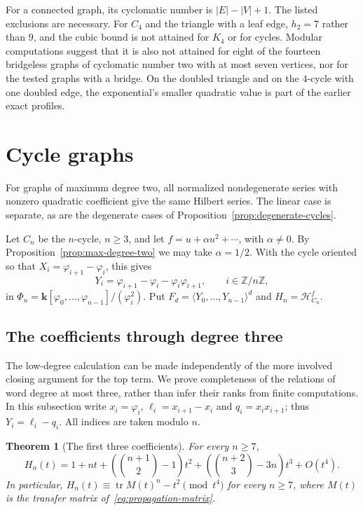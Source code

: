 \documentclass[reqno]{article}
\theoremstyle{plain} %
\newtheorem{theorem}{Theorem}[section]
\theoremstyle{definition}
\theoremstyle{remark}
\newcommand{\Z}{{\mathbb{Z}}}
\newcommand{\K} {\mathbf{k}}
\newcommand{\hs}{\mathscr{H}}
\numberwithin{equation}{section}
\begin{document}
For a connected graph, its cyclomatic number is $|E|-|V|+1$.
The listed exclusions are necessary. For $C_4$ and the triangle with a
leaf edge, $h_2=7$ rather than $9$, and the cubic bound is not attained
for $K_4$ or for cycles. Modular computations suggest that it is also not
attained for eight of the fourteen bridgeless graphs of cyclomatic number
two with at most seven vertices, nor for the tested graphs with a bridge.
On the doubled triangle and on the $4$-cycle with one doubled edge, the
exponential's smaller quadratic value is part of the earlier exact
profiles.


\section{Cycle graphs}
\label{sec:cycles}

For graphs of maximum degree two, all normalized nondegenerate series
with nonzero quadratic coefficient give the same Hilbert series. The
linear case is separate, as are the degenerate cases of
Proposition~\ref{prop:degenerate-cycles}.

Let $C_n$ be the $n$-cycle, $n\ge3$, and let
$f=u+\alpha u^2+\cdots$, with $\alpha\ne0$.
By Proposition~\ref{prop:max-degree-two} we may take $\alpha=1/2$. With the cycle oriented
so that $X_i=\varphi_{i+1}-\varphi_i$, this gives
\begin{equation}\label{eq:cycle-normalization}
Y_i=\varphi_{i+1}-\varphi_i-\varphi_i\varphi_{i+1},
\qquad i\in\Z/n\Z,
\end{equation}
in $\Phi_n=\K[\varphi_0,\ldots,\varphi_{n-1}]/(\varphi_i^2)$.
Put $F_d=\langle Y_0,\ldots,Y_{n-1}\rangle^d$ and
$H_n=\hs_{C_n}^f$.

\subsection{The coefficients through degree three}
\label{sec:cycle-low-coefficients}

The low-degree calculation can be made independently of the more
involved closing argument for the top term. We prove completeness of the
relations of word degree at most three, rather than infer their ranks
from finite computations. In this subsection write $x_i=\varphi_i$,
$\ell_i=x_{i+1}-x_i$ and $q_i=x_ix_{i+1}$; thus
$Y_i=\ell_i-q_i$. All indices are taken modulo $n$.

\begin{theorem}[The first three coefficients]\label{thm:cycle-low-coefficients}
For every $n\ge7$,
\begin{equation}\label{eq:cycle-low-coefficients}
 H_n(t)=1+nt+\left(\binom{n+1}{2}-1\right)t^2
              +\left(\binom{n+2}{3}-3n\right)t^3+O(t^4).
\end{equation}
In particular,
$H_n(t)\equiv\operatorname{tr}M(t)^n-t^2\pmod{t^4}$ for every $n\ge7$,
where $M(t)$ is the transfer matrix of~\eqref{eq:propagation-matrix}.
\end{theorem}
\end{document}
